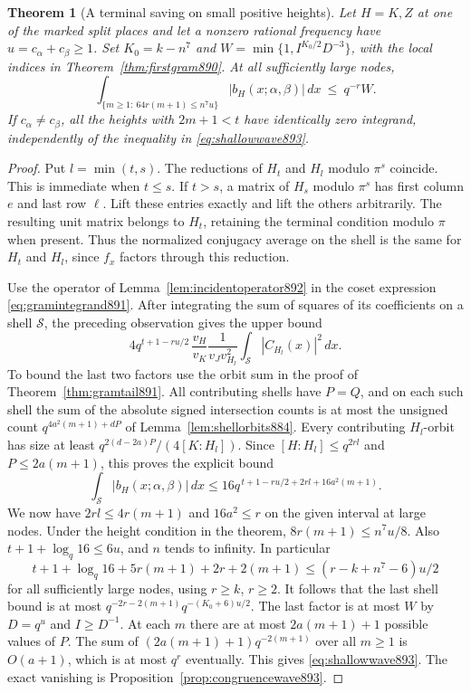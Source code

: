 \documentclass[a4paper,11pt]{article}
\newtheorem{theorem}[proposition]{Theorem}
\theoremstyle{definition}
\theoremstyle{remark}
\numberwithin{equation}{section}
\begin{document}
\begin{theorem}[A terminal saving on small positive heights]
\leavevmode\label{thm:shallowwave893}
Let \(H=K,Z\) at one of the marked split places and let a nonzero
rational frequency have \(u=c_\alpha+c_\beta\ge1\).
Set \(K_0=k-n^7\) and \(W=\min\{1,I^{K_0/2}D^{-3}\}\),
with the local indices in Theorem~\ref{thm:firstgram890}.
At all sufficiently large nodes,
\begin{equation}
  \int_{\{m\ge1:\ 64r(m+1)\le n^7u\}}
                   |b_H(x;\alpha,\beta)|\,dx \ \le\ q^{-r} W .
 \label{eq:shallowwave893}
\end{equation}
If \(c_\alpha\ne c_\beta\), all the heights with
\(2m+1<t\) have identically zero integrand, independently of
the inequality in \eqref{eq:shallowwave893}.
\end{theorem}
\begin{proof}
Put \(l=\min(t,s)\). The reductions of \(H_t\) and \(H_l\)
modulo \(\pi^s\) coincide. This is immediate when \(t\le s\).
If \(t>s\), a matrix of \(H_s\) modulo \(\pi^s\) has first
column \(e\) and last row \(\ell\). Lift these entries exactly
and lift the others arbitrarily. The resulting unit matrix
belongs to \(H_t\), retaining the terminal condition modulo
\(\pi\) when present. Thus the normalized conjugacy average on
the shell is the same for \(H_t\) and \(H_l\), since \(f_x\)
factors through this reduction.

Use the operator of Lemma~\ref{lem:incidentoperator892} in the
coset expression \eqref{eq:gramintegrand891}. After integrating
the sum of squares of its coefficients on a shell \(\mathcal S\),
the preceding observation gives the upper bound
\[
  4q^{t+1-ru/2}\,
   \frac{v_H}{v_K}\frac{1}{v_J v_{H_l}^2}
                       \int_{\mathcal S}|C_{H_l}(x)|^2\,dx .
\]
To bound the last two factors use the orbit sum in the proof of
Theorem~\ref{thm:gramtail891}. All contributing shells have
\(P=Q\), and on each such shell the sum of the absolute signed
intersection counts is at most the unsigned count
\(q^{4a^2(m+1)+dP}\) of Lemma~\ref{lem:shellorbits884}.
Every contributing \(H_l\)-orbit has size at least
\(q^{2(d-2a)P}/(4[K:H_l])\). Since \([H:H_l]\le q^{2rl}\)
and \(P\le2a(m+1)\), this proves the explicit bound
\[
        \int_{\mathcal S}|b_H(x;\alpha,\beta)|\,dx
        \le 16q^{\,t+1-ru/2+2rl+16a^2(m+1)}.
\]
We now have \(2rl\le4r(m+1)\) and \(16a^2\le r\) on the given
interval at large nodes. Under the height condition in the
theorem, \(8r(m+1)\le n^7u/8\). Also
\(t+1+\log_q16\le6u\), and \(n\) tends to infinity. In particular
\[
 t+1+\log_q16+5r(m+1)+2r+2(m+1)
          \le (r-k+n^7-6)u/2
\]
for all sufficiently large nodes, using \(r\ge k\), \(r\ge2\).
It follows that the last shell bound is at most
\(q^{-2r-2(m+1)}q^{-(K_0+6)u/2}\).
The last factor is at most \(W\) by \(D=q^u\) and \(I\ge D^{-1}\).
At each \(m\) there are at most \(2a(m+1)+1\) possible values
of \(P\). The sum of \((2a(m+1)+1)q^{-2(m+1)}\) over all
\(m\ge1\) is \(O(a+1)\), which is at most \(q^r\) eventually.
This gives \eqref{eq:shallowwave893}. The exact vanishing is
Proposition~\ref{prop:congruencewave893}.
\end{proof}
\end{document}
